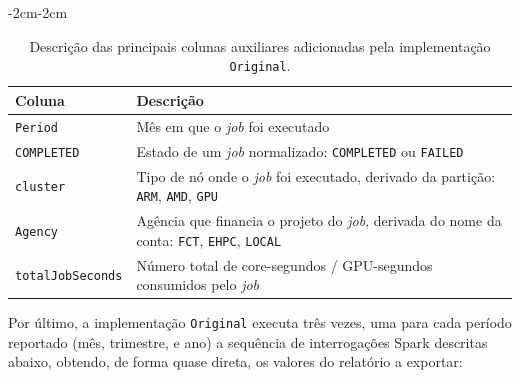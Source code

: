 \documentclass[11pt, a4paper]{article}
\begin{document}
\begin{table}[H]
    \begin{adjustwidth}{-2cm}{-2cm}
        \centering
        \begin{tabular}{@{}|l|l|}
            \hline
            \textbf{Coluna} & \textbf{Descrição} \\

            \hline
            \texttt{Period}                       &
            Mês em que o \emph{job} foi executado \\

            \hline
            \texttt{COMPLETED}                        &
            Estado de um \emph{job} normalizado:
                \texttt{COMPLETED} ou \texttt{FAILED} \\

            \hline
            \texttt{cluster}                                                  &
            Tipo de nó onde o \emph{job} foi executado, derivado da partição:
                \texttt{ARM}, \texttt{AMD}, \texttt{GPU}                      \\

            \hline
            \texttt{Agency}                                                          &
            Agência que financia o projeto do \emph{job}, derivada do nome da conta:
                \texttt{FCT}, \texttt{EHPC}, \texttt{LOCAL}                          \\

            \hline
            \texttt{totalJobSeconds}                                                    &
                Número total de core-segundos / GPU-segundos consumidos pelo \emph{job} \\
            \hline
        \end{tabular}
    \end{adjustwidth}

    \caption{
        Descrição das principais colunas auxiliares adicionadas pela implementação
        \texttt{Original}.
    }
    \label{added-columns}
\end{table}

Por último, a implementação \texttt{Original} executa três vezes, uma para cada período reportado
(mês, trimestre, e ano) a sequência de interrogações Spark descritas abaixo, obtendo, de forma
quase direta, os valores do relatório a exportar:
\end{document}
